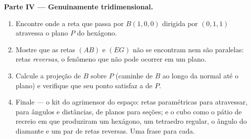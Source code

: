 \begin{problem}
\medskip
\noindent\textbf{Parte IV --- Genuinamente tridimensional.}
\begin{enumerate}[resume]
  \item Encontre onde a reta que passa por $B(1,0,0)$ dirigida
        por $(0,1,1)$ atravessa o plano $P$ do hexágono.
  \item Mostre que as retas $(AB)$ e $(EG)$ não se encontram
        nem são paralelas: retas \emph{reversas}, o fenômeno
        que não pode ocorrer em um plano.
  \item Calcule a projeção  de $B$ sobre $P$ (caminhe
        de $B$ ao longo da normal até o plano) e verifique que
        seu ponto satisfaz a  de $P$.
  \item Finale --- o kit do agrimensor do espaço: retas
        paramétricas para atravessar,  para
        ângulos e distâncias,  de planos para seções; e
        o cubo como o pátio de recreio em que produziram um
        hexágono, um tetraedro regular, o ângulo do diamante e
        um par de retas reversas. Uma frase para cada.
\end{enumerate}
\end{problem}
